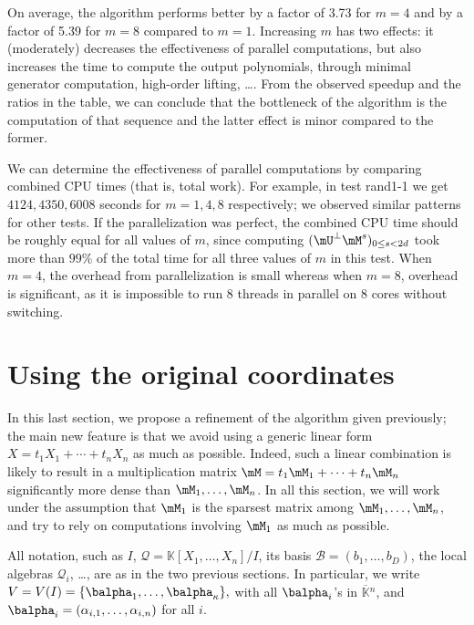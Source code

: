 \documentclass[12pt]{article}
\newcommand{\basis}{\mathscr{B}}
\newcommand{\lf}{X}
\newcommand{\residueI}{\mathscr{Q}}
\def\dg{\kappa}
\def\K{\mathbb{K}}
\def\K {\ensuremath{\mathbb{K}}}
\def\Kbar {{\ensuremath{\overline{\mathbb{K}}}}}
\begin{document}
On average, the algorithm performs better by a factor of 3.73 for
$m=4$ and by a factor of 5.39 for $m=8$ compared to $m=1$. Increasing
$m$ has two effects: it (moderately) decreases the effectiveness of
parallel computations, but also increases the time to compute the
output polynomials, through minimal generator computation, high-order
lifting, \dots. From the observed speedup and the ratios in the table,
we can conclude that the bottleneck of the algorithm is the
computation of that sequence and the latter effect is minor compared
to the former.

We can determine the effectiveness of parallel computations by
comparing combined CPU times (that is, total work).  For example, in
test rand1-1 we get $4124, 4350, 6008$ seconds for $m=1,4,8$
respectively; we observed similar patterns for other tests. If the
parallelization was perfect, the combined CPU time should be roughly
equal for all values of $m$, since computing $(\mU^{\perp}
\mM^s)_{0 \le s< 2d}$ took more than $99\%$ of the total time for all three
values of $m$ in this test. When $m=4$, the overhead from
parallelization is small whereas when $m=8$, overhead is significant,
as it is impossible to run 8 threads in parallel on 8 cores without
switching.


\section{Using the original coordinates}\label{sec:original}

In this last section, we propose a refinement of the algorithm given
previously; the main new feature is that we avoid using a generic
linear form $\lf = t_1 X_1 + \cdots + t_n X_n$ as much as possible.
Indeed, such a linear combination is likely to result in a
multiplication matrix $\mM = t_1 \mM_1 + \cdots + t_n \mM_n$
significantly more dense than $\mM_1,\dots,\mM_n$. In all this
section, we will work under the assumption that $\mM_1$ is the sparsest
matrix among $\mM_1,\dots,\mM_n$, and try to rely on computations
involving $\mM_1$ as much as possible.

All notation, such as $I$, $\residueI=\K[X_1,\dots,X_n]/I$, its basis
$\basis=(b_1,\dots,b_D)$, the local algebras $\residueI_i$, \dots, are as in the two previous sections.
In particular, we write $V=V(I)=\{\balpha_1,\dots,\balpha_\dg\},$ with
all $\balpha_i$'s in $\Kbar{}^n$, and
$\balpha_i=(\alpha_{i,1},\dots,\alpha_{i,n})$ for all $i$.
\end{document}
